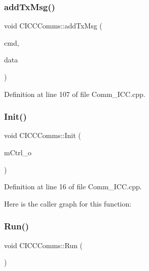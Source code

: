 \subsubsection{\texorpdfstring{addTxMsg()}{addTxMsg()}}
{\footnotesize\ttfamily void C\+I\+C\+C\+Comms\+::add\+Tx\+Msg (\begin{DoxyParamCaption}\item[{\mbox{\hyperlink{_a_d_a_s___types_8h_aba7bc1797add20fe3efdf37ced1182c5}{uint8\+\_\+t}}}]{cmd,  }\item[{signed int}]{data }\end{DoxyParamCaption})\hspace{0.3cm}{\ttfamily [virtual]}}



Definition at line 107 of file Comm\+\_\+\+I\+C\+C.\+cpp.

\mbox{\label{class_c_i_c_c_comms_a56fc0858965ed1f1f9b3295602472c7e}} 
\subsubsection{\texorpdfstring{Init()}{Init()}}
{\footnotesize\ttfamily void C\+I\+C\+C\+Comms\+::\+Init (\begin{DoxyParamCaption}\item[{\mbox{\hyperlink{class_c_motor_ctrl}{C\+Motor\+Ctrl}} $\ast$}]{m\+Ctrl\+\_\+o }\end{DoxyParamCaption})\hspace{0.3cm}{\ttfamily [virtual]}}



Definition at line 16 of file Comm\+\_\+\+I\+C\+C.\+cpp.

Here is the caller graph for this function\+:
\mbox{\label{class_c_i_c_c_comms_a8b3fa81307b3b9ba0e72b4aee8279c56}} 
\subsubsection{\texorpdfstring{Run()}{Run()}}
{\footnotesize\ttfamily void C\+I\+C\+C\+Comms\+::\+Run (\begin{DoxyParamCaption}\item[{void}]{ }\end{DoxyParamCaption})\hspace{0.3cm}{\ttfamily [virtual]}}



